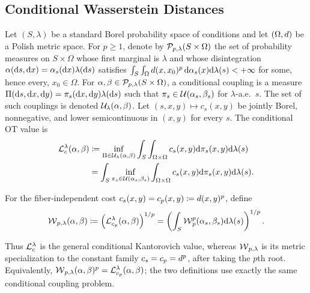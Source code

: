 \subsection{Conditional Wasserstein Distances}
\label{sec-conditional-wasserstein-distances}
\begin{defn}\label{def-conditional-ot}
Let $(S,\lambda)$ be a standard Borel probability space of conditions and let $(\Omega,d)$ be a Polish metric space. For $p\geq1$, denote by $\mathcal{P}_{p,\lambda}(S\times\Omega)$ the set of probability measures on $S\times\Omega$ whose first marginal is $\lambda$ and whose disintegration
\(\alpha(\mathrm{d} s,\mathrm{d} x)=\alpha_s(\mathrm{d} x)\lambda(\mathrm{d} s)\)
satisfies $\int_S\int_\Omega d(x,x_0)^p\,\mathrm{d}\alpha_s(x)\mathrm{d}\lambda(s)<+\infty$ for some, hence every, $x_0\in\Omega$.
For $\alpha,\beta\in\mathcal{P}_{p,\lambda}(S\times\Omega)$, a conditional coupling is a measure
\(\Pi(\mathrm{d} s,\mathrm{d} x,\mathrm{d} y) = \pi_s(\mathrm{d} x,\mathrm{d} y)\lambda(\mathrm{d} s)\)
such that $\pi_s\in\mathcal{U}(\alpha_s,\beta_s)$ for $\lambda$-a.e.\ $s$. The set of such couplings is denoted $\mathcal{U}_\lambda(\alpha,\beta)$.
Let $(s,x,y)\mapsto c_s(x,y)$ be jointly Borel, nonnegative, and lower semicontinuous in $(x,y)$ for every $s$. The conditional OT value is
\begin{equation}\label{eq-conditional-ot-general}
\begin{aligned}
\mathcal{L}_c^\lambda(\alpha,\beta)
&\coloneqq
\inf_{\Pi\in\mathcal{U}_\lambda(\alpha,\beta)}
\int_S\int_{\Omega\times\Omega} c_s(x,y)\mathrm{d}\pi_s(x,y)\mathrm{d}\lambda(s) \\
&=
\int_S
\inf_{\pi_s\in\mathcal{U}(\alpha_s,\beta_s)}
\int_{\Omega\times\Omega} c_s(x,y)\mathrm{d}\pi_s(x,y)
\mathrm{d}\lambda(s).
\end{aligned}
\end{equation}
\end{defn}
\begin{defn}\label{def-conditional-wasserstein-distance}
For the fiber-independent cost $c_s(x,y)=c_p(x,y)\coloneqq d(x,y)^p$, define
\begin{equation}\label{eq-conditional-wasserstein-distance}
\operatorname{\mathcal{W}}_{p,\lambda}(\alpha,\beta)
\coloneqq
\left(\mathcal{L}_{c_p}^\lambda(\alpha,\beta)\right)^{1/p}
=
\left(
\int_S \operatorname{\mathcal{W}}_p^p(\alpha_s,\beta_s)\mathrm{d}\lambda(s)
\right)^{1/p}.
\end{equation}
\end{defn}
Thus $\mathcal{L}_c^\lambda$ is the general conditional Kantorovich value, whereas $\operatorname{\mathcal{W}}_{p,\lambda}$ is its metric specialization to the constant family $c_s=c_p=d^p$, after taking the $p$th root. Equivalently, $\operatorname{\mathcal{W}}_{p,\lambda}(\alpha,\beta)^p = \mathcal{L}_{c_p}^\lambda(\alpha,\beta)$; the two definitions use exactly the same conditional coupling problem.

